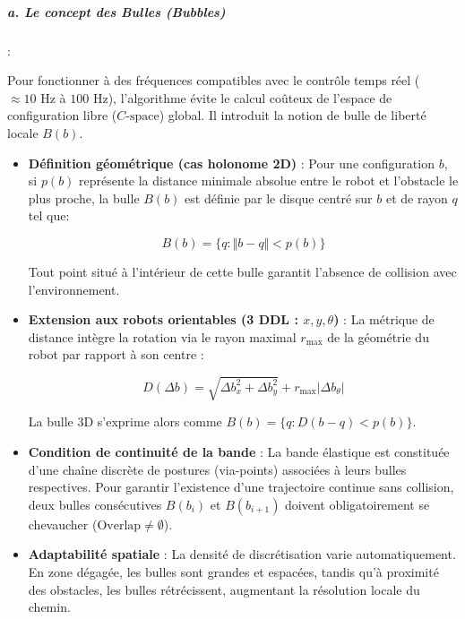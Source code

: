 \subparagraph{a. Le concept des Bulles (Bubbles)}:

Pour fonctionner à des fréquences compatibles avec le contrôle temps réel ($\approx 10\text{ Hz}$ à $100\text{ Hz}$), l'algorithme évite le calcul coûteux de l'espace de configuration libre ($C\text{-space}$) global. Il introduit la notion de bulle de liberté locale $B(b)$.\\

\begin{itemize}

    \item \textbf{Définition géométrique (cas holonome 2D)} : Pour une configuration $b$, si $p(b)$ représente la distance minimale absolue entre le robot et l'obstacle le plus proche, la bulle $B(b)$ est définie par le disque centré sur $b$ et de rayon $q$ tel que:
    
    \begin{equation}
        B(b) = \{q : \Vert{}b - q\Vert{} < p(b)\}  
        \label{eq9}
    \end{equation}

    Tout point situé à l'intérieur de cette bulle garantit l'absence de collision avec l'environnement. \\

    \item \textbf{Extension aux robots orientables (3 DDL : $x, y, \theta$)} : La métrique de distance intègre la rotation via le rayon maximal $r_{\max}$ de la géométrie du robot par rapport à son centre :
    
    \begin{equation}
        D(\Delta b) = \sqrt{\Delta b_x^2 + \Delta b_y^2} + r_{\max} \vert{}\Delta b_\theta\vert{}
        \label{eq10}
    \end{equation}

    La bulle 3D s'exprime alors comme $B(b) = \{q : D(b - q) < p(b)\}$. \\

    \item \textbf{Condition de continuité de la bande} : La bande élastique est constituée d'une chaîne discrète de postures (via-points) associées à leurs bulles respectives. Pour garantir l'existence d'une trajectoire continue sans collision, deux bulles consécutives $B(b_i)$ et $B(b_{i+1})$ doivent obligatoirement se chevaucher ($\text{Overlap} \neq \emptyset$).\\

    \item \textbf{Adaptabilité spatiale} : La densité de discrétisation varie automatiquement. En zone dégagée, les bulles sont grandes et espacées, tandis qu'à proximité des obstacles, les bulles rétrécissent, augmentant la résolution locale du chemin.

\end{itemize}


